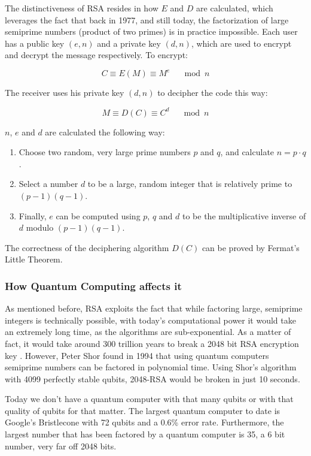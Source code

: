 The distinctiveness of RSA resides in how $E$ and $D$ are calculated, which
leverages the fact that back in 1977, and still today, the factorization of
large semiprime numbers (product of two primes) is in practice impossible. Each
user has a public key $(e, n)$ and a private key $(d,n)$, which are used to encrypt
and decrypt the message respectively. To encrypt:

\begin{equation}
    C \equiv E(M) \equiv M^e \quad \mod n
\end{equation}

The receiver uses his private key $(d,n)$ to decipher the code this way:

\begin{equation}
    M \equiv D(C) \equiv C^d \quad \mod n
\end{equation}

$n$, $e$ and $d$ are calculated the following way:
\begin{enumerate}
    \item Choose two random, very large prime numbers $p$ and $q$, and calculate $n = p \cdot q$.
    \item Select a number $d$ to be a large, random integer that is relatively prime to $(p-1)(q-1)$.
    \item Finally, $e$ can be computed using $p$, $q$ and $d$ to be the multiplicative inverse of $d$ modulo $(p-1)(q-1)$.
\end{enumerate}

The correctness of the deciphering algorithm $D(C)$ can be proved by Fermat's Little Theorem.

\subsubsection{How Quantum Computing affects it}

As mentioned before, RSA exploits the fact that while factoring large,
semiprime integers is technically possible, with today’s computational
power it would take an extremely long time, as the algorithms are
sub-exponential. As a matter of fact, it would take around 300 trillion
years to break a 2048 bit RSA encryption key
\cite{andreas_baumhof_breaking_2019}. However, Peter Shor found
in 1994 that using quantum computers semiprime numbers can be factored
in polynomial time. Using Shor’s algorithm with 4099 perfectly stable
qubits, 2048-RSA would be broken in just 10 seconds.

Today we don’t have a quantum computer with that many qubits or with
that quality of qubits for that matter. The largest quantum computer to
date is Google’s Bristlecone with 72 qubits and a 0.6\% error rate.
Furthermore, the largest number that has been factored by a quantum
computer is 35, a 6 bit number, very far off 2048 bits.


